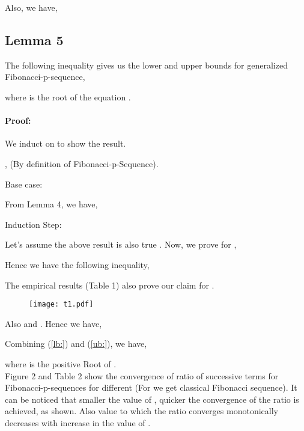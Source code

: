 \documentclass{ijcsa}
\begin{document}
Also, we have,


\subsection{Lemma 5}
\label{sec:Lemma5}
\par The following inequality gives us the lower and upper bounds for generalized Fibonacci-p-sequence,

\par where  is the  root of the equation .
\paragraph{Proof:} 
\label{sec:Proof_5}
\par We induct on  to show the result. \\
\par , (By definition of Fibonacci-p-Sequence). \\
\par Base case: 
\par From Lemma 4, we have, 

\par Induction Step:
\par Let's assume the above result is also true . Now, we prove for ,


Hence we have the following inequality,


\par The empirical results (Table 1) also prove our claim for . \\

\par
\begin{figure}[htbp]
	\label{fig:t1}
	\centering
		\texttt{[image: t1.pdf]}
\end{figure}

\par Also  and . Hence we have,



\par Combining (\ref{lb:}) and (\ref{ub:}), we have,

\par where  is the positive Root of . \\

Figure 2 and Table 2 show the convergence of ratio of successive terms for Fibonacci-p-sequences for different  (For  we get classical Fibonacci sequence). It can be noticed that smaller the value of , quicker the convergence of the ratio is achieved, as shown. Also value to which the ratio converges monotonically decreases with increase in the value of .
\end{document}
